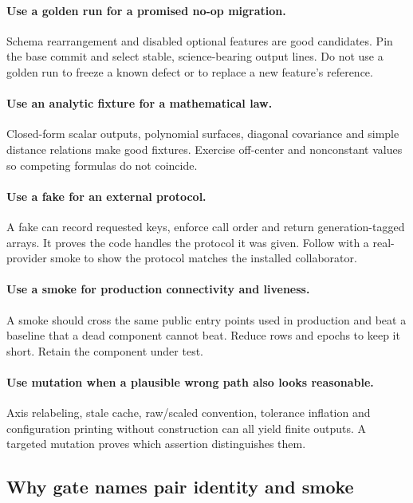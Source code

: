 \paragraph{Use a golden run for a promised no-op migration.}
Schema rearrangement and disabled optional features are good candidates.  Pin
the base commit and select stable, science-bearing output lines.  Do not use a
golden run to freeze a known defect or to replace a new feature's reference.

\paragraph{Use an analytic fixture for a mathematical law.}
Closed-form scalar outputs, polynomial surfaces, diagonal covariance and
simple distance relations make good fixtures.  Exercise off-center and
nonconstant values so competing formulas do not coincide.

\paragraph{Use a fake for an external protocol.}
A fake can record requested keys, enforce call order and return
generation-tagged arrays.  It proves the code handles the protocol it was
given.  Follow with a real-provider smoke to show the protocol matches the
installed collaborator.

\paragraph{Use a smoke for production connectivity and liveness.}
A smoke should cross the same public entry points used in production and beat
a baseline that a dead component cannot beat.  Reduce rows and epochs to keep
it short.  Retain the component under test.

\paragraph{Use mutation when a plausible wrong path also looks reasonable.}
Axis relabeling, stale cache, raw/scaled convention, tolerance inflation and
configuration printing without construction can all yield finite outputs.
A targeted mutation proves which assertion distinguishes them.

\subsection{Why gate names pair identity and smoke}

